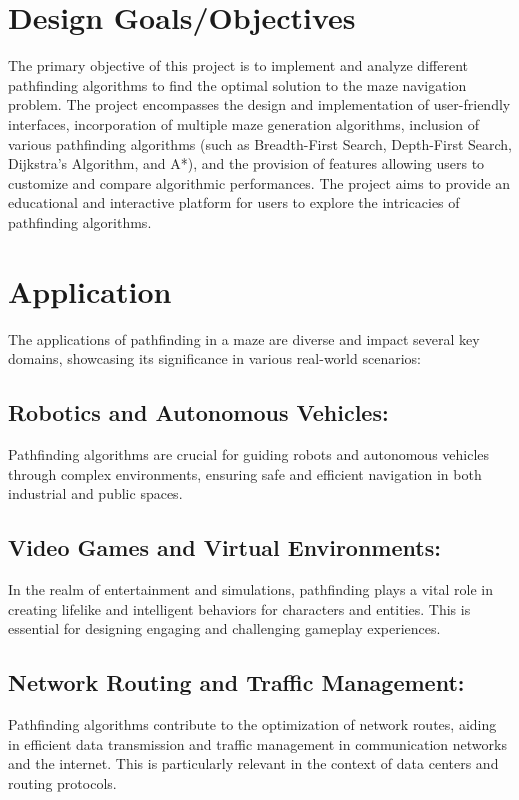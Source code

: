 \documentclass[12pt]{report}
\begin{document}
\section{Design Goals/Objectives}
The primary objective of this project is to implement and analyze different pathfinding algorithms to find the optimal solution to the maze navigation problem. The project encompasses the design and implementation of user-friendly interfaces, incorporation of multiple maze generation algorithms, inclusion of various pathfinding algorithms (such as Breadth-First Search, Depth-First Search, Dijkstra's Algorithm, and A*), and the provision of features allowing users to customize and compare algorithmic performances. The project aims to provide an educational and interactive platform for users to explore the intricacies of pathfinding algorithms.

\section{Application}
The applications of pathfinding in a maze are diverse and impact several key domains, showcasing its significance in various real-world scenarios:



\subsection{Robotics and Autonomous Vehicles: }
Pathfinding algorithms are crucial for guiding robots and autonomous vehicles through complex environments, ensuring safe and efficient navigation in both industrial and public spaces.\\
\subsection{Video Games and Virtual Environments:}
In the realm of entertainment and simulations, pathfinding plays a vital role in creating lifelike and intelligent behaviors for characters and entities. This is essential for designing engaging and challenging gameplay experiences.\\
\subsection{Network Routing and Traffic Management: }
Pathfinding algorithms contribute to the optimization of network routes, aiding in efficient data transmission and traffic management in communication networks and the internet. This is particularly relevant in the context of data centers and routing protocols.\\
\end{document}
